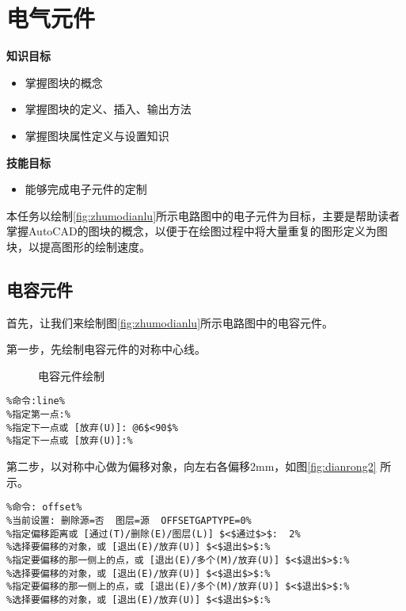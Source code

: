 \section{电气元件}\label{sec:dianqiyuanjian}

{\bfseries 知识目标}
\begin{itemize}
\item 掌握图块的概念
\item 掌握图块的定义、插入、输出方法
\item 掌握图块属性定义与设置知识
\end{itemize}

{\bfseries 技能目标}
\begin{itemize}
\item 能够完成电子元件的定制
\end{itemize}

本任务以绘制\ref{fig:zhumodianlu}所示电路图中的电子元件为目标，主要是帮助读者掌握AutoCAD的图块的概念，以便于在绘图过程中将大量重复的图形定义为图块，以提高图形的绘制速度。

\subsection{电容元件}
首先，让我们来绘制图\ref{fig:zhumodianlu}所示电路图中的电容元件。

第一步，先绘制电容元件的对称中心线。

\noindent
\begin{figure}[htbp]
\centering
{}\hspace{20pt}
\hspace{20pt}
\caption{电容元件绘制}
\end{figure}
\begin{lstlisting}
%命令:line%
%指定第一点:%
%指定下一点或 [放弃(U)]: @6$<90$%
%指定下一点或 [放弃(U)]:%
\end{lstlisting}

第二步，以对称中心做为偏移对象，向左右各偏移2mm，如图\ref{fig:dianrong2} 所示。

\begin{lstlisting}
%命令: offset%
%当前设置: 删除源=否  图层=源  OFFSETGAPTYPE=0%
%指定偏移距离或 [通过(T)/删除(E)/图层(L)] $<$通过$>$:  2%
%选择要偏移的对象，或 [退出(E)/放弃(U)] $<$退出$>$:%
%指定要偏移的那一侧上的点，或 [退出(E)/多个(M)/放弃(U)] $<$退出$>$:%
%选择要偏移的对象，或 [退出(E)/放弃(U)] $<$退出$>$:%
%指定要偏移的那一侧上的点，或 [退出(E)/多个(M)/放弃(U)] $<$退出$>$:%
%选择要偏移的对象，或 [退出(E)/放弃(U)] $<$退出$>$:%
\end{lstlisting}

